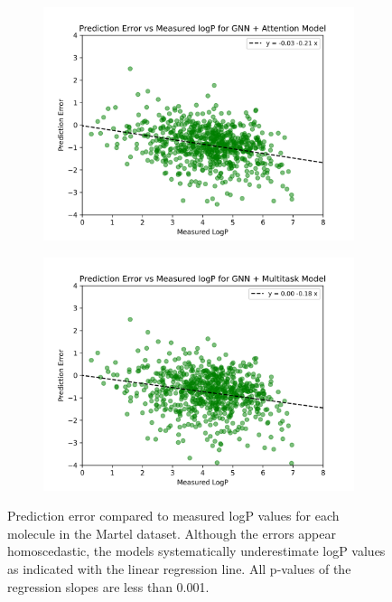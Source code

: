 \documentclass{article}
\begin{document}
\begin{figure}
\bigskip %
\begin{subfigure}[t]{0.45\textwidth}
    \includegraphics[width=\linewidth]{./../plots/martel_errors_gnn_attention.png}
\end{subfigure}\hspace{\fill} %
\begin{subfigure}[t]{0.45\textwidth}
    \includegraphics[width=\linewidth]{./../plots/martel_errors_gnn_multi.png}
\end{subfigure}

\caption{Prediction error compared to measured logP values for each molecule in the Martel dataset. Although the errors appear homoscedastic, the models systematically underestimate logP values as indicated with the linear regression line. All p-values of the regression slopes are less than 0.001.}
\label{figure2}
\end{figure}
\end{document}
